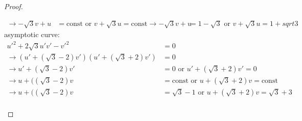 \documentclass[10pt,a4paper]{article}
\begin{document}
\begin{proof}
\begin{enumerate}[{ (}a{)}]
\begin{align*}
\rightarrow -\sqrt{3}v+u&=\textrm{const or }v+\sqrt{3}u=\textrm{const}
\rightarrow -\sqrt{3}v+u&=1-\sqrt{3}\textrm{ or }v+\sqrt{3}u=1+sqrt{3}
\end{align*}
asymptotic curve:
\begin{align*}
u'^2+2\sqrt{3}u'v'-v'^2&=0\\
\rightarrow (u'+(\sqrt{3}-2)v')(u'+(\sqrt{3}+2)v')&=0\\
\rightarrow u'+(\sqrt{3}-2)v'&=0\textrm{ or }u'+(\sqrt{3}+2)v'=0\\
\rightarrow u+((\sqrt{3}-2)v&=\textrm{const or }u+(\sqrt{3}+2)v=\textrm{const}\\
\rightarrow u+((\sqrt{3}-2)v&=\sqrt{3}-1\textrm{ or }u+(\sqrt{3}+2)v=\sqrt{3}+3\\
\end{align*}
\end{enumerate}
\end{proof}
\end{document}
